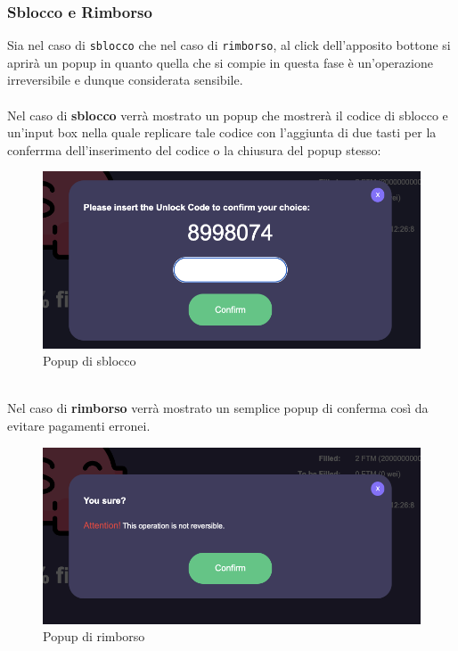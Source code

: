            \subsubsection{Sblocco e Rimborso}
       Sia nel caso di \texttt{sblocco} che nel caso di \texttt{rimborso}, al click dell'apposito bottone si aprirà un popup in quanto quella che si compie in questa fase è un'operazione irreversibile e dunque considerata sensibile.\\\\
        Nel caso di \textbf{sblocco} verrà mostrato un popup che mostrerà il codice di sblocco e un'input box nella quale replicare tale codice con l'aggiunta di due tasti per la conferrma dell'inserimento del codice o la chiusura del popup stesso:
        \begin{figure}[H]
            \centering
            \includegraphics[scale=0.3]{immagini/Checkout/UnlockPopUp.png} 
            \caption{Popup di sblocco}
        \end{figure}
        \textbf{}\\
        Nel caso di \textbf{rimborso} verrà mostrato un semplice popup di conferma così da evitare pagamenti erronei.
        \begin{figure}[H]
            \centering
            \includegraphics[scale=0.3]{immagini/Checkout/RefundPopUp.png} 
            \caption{Popup di rimborso}
        \end{figure}

